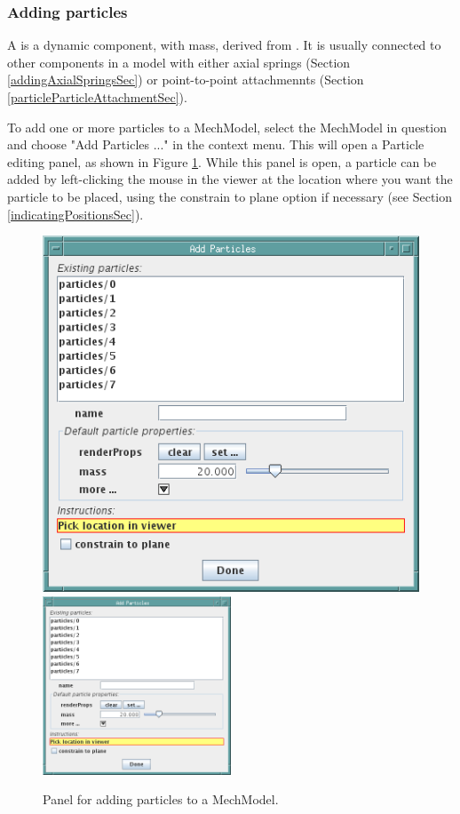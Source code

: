 \documentclass{article}
\begin{document}
\subsubsection{Adding particles}

A  is a dynamic component,
with mass, derived from . It is
usually connected to other components in a model with either axial
springs (Section \ref{addingAxialSpringsSec}) or point-to-point attachmennts
(Section \ref{particleParticleAttachmentSec}).

To add one or more particles to a MechModel, select the MechModel in
question and choose {\sf "Add Particles ..."} in the context menu. This
will open a Particle editing panel, as shown in
Figure \ref{addParticlesPanelFig}. While this panel is open, a particle can be
added by left-clicking the mouse in the viewer at the location where
you want the particle to be placed, using the {\sf constrain to plane} option if
necessary (see Section \ref{indicatingPositionsSec}).

\begin{figure}
\begin{center}
\iflatexml
\includegraphics[]{images/addParticlesPanel}
\else
\includegraphics[width=0.50\textwidth]{images/addParticlesPanel}
\fi
\end{center}
\caption{Panel for adding particles to a MechModel.}%
\label{addParticlesPanelFig}
\end{figure}
\end{document}
